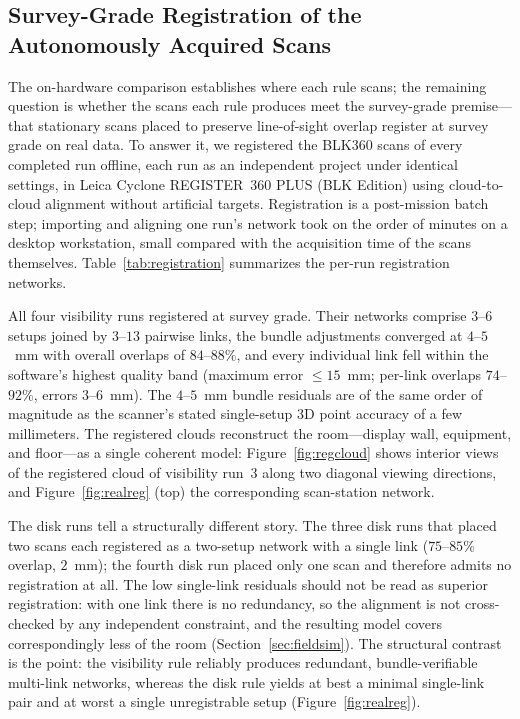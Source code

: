 \documentclass[sensors,article,submit,pdftex,moreauthors]{Definitions/mdpi}
\begin{document}
\subsection{Survey-Grade Registration of the Autonomously Acquired Scans}
\label{sec:realhw}

The on-hardware comparison establishes where each rule scans; the remaining
question is whether the scans each rule produces meet the survey-grade
premise---that stationary scans placed to preserve line-of-sight overlap
register at survey grade on real data. To answer it, we registered the BLK360
scans of every completed run offline, each run as an independent project under
identical settings, in Leica Cyclone REGISTER~360 PLUS (BLK Edition) using
cloud-to-cloud alignment without artificial targets.
Registration is a post-mission batch step; importing and aligning one run's
network took on the order of minutes on a desktop workstation, small compared
with the acquisition time of the scans themselves.
Table~\ref{tab:registration} summarizes the per-run registration networks.

All four visibility runs registered at survey grade. Their networks comprise
$3$--$6$ setups joined by $3$--$13$ pairwise links, the bundle adjustments
converged at $4$--$5$~mm with overall overlaps of $84$--$88\%$, and every
individual link fell within the software's highest quality band (maximum error
$\le15$~mm; per-link overlaps $74$--$92\%$, errors $3$--$6$~mm). The
$4$--$5$~mm bundle residuals are of the same order of magnitude as the
scanner's stated single-setup 3D point accuracy of a few millimeters.
The registered clouds reconstruct the room---display wall, equipment, and
floor---as a single coherent model: Figure~\ref{fig:regcloud} shows
interior views of the registered cloud of visibility run~3 along two diagonal
viewing directions, and Figure~\ref{fig:realreg} (top) the corresponding
scan-station network.

The disk runs tell a structurally different story. The three disk runs that
placed two scans each registered as a two-setup network with a single link
($75$--$85\%$ overlap, $2$~mm); the fourth disk run placed only one scan and
therefore admits no registration at all. The low single-link residuals should
not be read as superior registration: with one link there is no redundancy, so
the alignment is not cross-checked by any independent constraint, and the
resulting model covers correspondingly less of the room
(Section~\ref{sec:fieldsim}). The structural contrast is the point: the
visibility rule reliably produces redundant, bundle-verifiable multi-link
networks, whereas the disk rule yields at best a minimal single-link pair and
at worst a single unregistrable setup (Figure~\ref{fig:realreg}).
\end{document}
